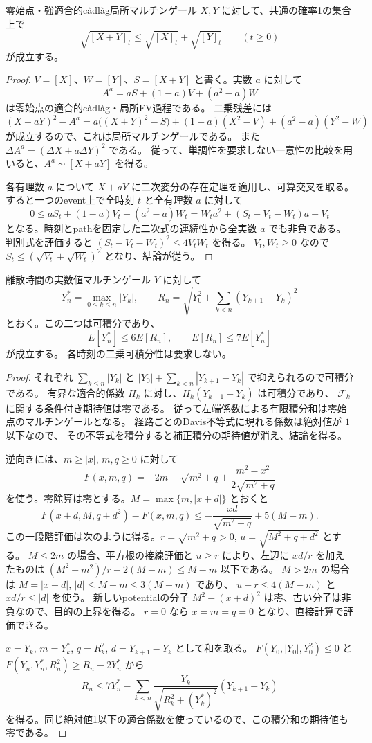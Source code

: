\begin{lemma}[二次変分の平方根の三角不等式]
零始点・強適合的c\`adl\`ag局所マルチンゲール $X,Y$ に対して、共通の確率1の集合上で
\[
 \sqrt{[X+Y]_t}\le\sqrt{[X]_t}+\sqrt{[Y]_t}\qquad(t\ge0)
\]
が成立する。
\end{lemma}
\begin{proof}
$V=[X]$、$W=[Y]$、$S=[X+Y]$ と書く。実数 $a$ に対して
\[
 A^a=aS+(1-a)V+(a^2-a)W
\]
は零始点の適合的c\`adl\`ag・局所FV過程である。
二乗残差には
\[
 (X+aY)^2-A^a
 =a\bigl((X+Y)^2-S\bigr)+(1-a)(X^2-V)+(a^2-a)(Y^2-W)
\]
が成立するので、これは局所マルチンゲールである。
また $\Delta A^a=(\Delta X+a\Delta Y)^2$ である。
従って、単調性を要求しない一意性の比較を用いると、$A^a\sim[X+aY]$ を得る。

各有理数 $a$ について $X+aY$ に二次変分の存在定理を適用し、可算交叉を取る。
すると一つのevent上で全時刻 $t$ と全有理数 $a$ に対して
\[
 0\le aS_t+(1-a)V_t+(a^2-a)W_t
   =W_ta^2+(S_t-V_t-W_t)a+V_t
\]
となる。時刻とpathを固定した二次式の連続性から全実数 $a$ でも非負である。
判別式を評価すると $(S_t-V_t-W_t)^2\le4V_tW_t$ を得る。
$V_t,W_t\ge0$ なので $S_t\le(\sqrt{V_t}+\sqrt{W_t})^2$ となり、結論が従う。
\end{proof}

\begin{lemma}
離散時間の実数値マルチンゲール $Y$ に対して
\[
 Y_n^*=\max_{0\le k\le n}|Y_k|,\qquad
 R_n=\sqrt{Y_0^2+\sum_{k<n}(Y_{k+1}-Y_k)^2}
\]
とおく。この二つは可積分であり、
\[
 E[Y_n^*]\le6E[R_n],\qquad E[R_n]\le7E[Y_n^*]
\]
が成立する。
各時刻の二乗可積分性は要求しない。
\end{lemma}
\begin{proof}
それぞれ $\sum_{k\le n}|Y_k|$ と
$|Y_0|+\sum_{k<n}|Y_{k+1}-Y_k|$ で抑えられるので可積分である。
有界な適合的係数 $H_k$ に対し、$H_k(Y_{k+1}-Y_k)$ は可積分であり、
$\mathcal F_k$ に関する条件付き期待値は零である。
従って左端係数による有限積分和は零始点のマルチンゲールとなる。
経路ごとのDavis不等式に現れる係数は絶対値が $1$ 以下なので、
その不等式を積分すると補正積分の期待値が消え、結論を得る。

逆向きには、$m\ge|x|$, $m,q\ge0$ に対して
\[
 F(x,m,q)=-2m+\sqrt{m^2+q}+\frac{m^2-x^2}{2\sqrt{m^2+q}}
\]
を使う。零除算は零とする。$M=\max\{m,|x+d|\}$ とおくと
\[
 F(x+d,M,q+d^2)-F(x,m,q)
 \le-\frac{xd}{\sqrt{m^2+q}}+5(M-m).
\]
この一段階評価は次のように得る。$r=\sqrt{m^2+q}>0$,
$u=\sqrt{M^2+q+d^2}$ とする。
$M\le2m$ の場合、平方根の接線評価と $u\ge r$ により、左辺に $xd/r$ を加えたものは
$(M^2-m^2)/r-2(M-m)\le M-m$ 以下である。
$M>2m$ の場合は $M=|x+d|$, $|d|\le M+m\le3(M-m)$ であり、
$u-r\le4(M-m)$ と $xd/r\le|d|$ を使う。
新しいpotentialの分子 $M^2-(x+d)^2$ は零、古い分子は非負なので、目的の上界を得る。
$r=0$ なら $x=m=q=0$ となり、直接計算で評価できる。

$x=Y_k$, $m=Y_k^*$, $q=R_k^2$, $d=Y_{k+1}-Y_k$ として和を取る。
$F(Y_0,|Y_0|,Y_0^2)\le0$ と $F(Y_n,Y_n^*,R_n^2)\ge R_n-2Y_n^*$ から
\[
 R_n\le7Y_n^*-\sum_{k<n}
 \frac{Y_k}{\sqrt{R_k^2+(Y_k^*)^2}}(Y_{k+1}-Y_k)
\]
を得る。同じ絶対値1以下の適合係数を使っているので、この積分和の期待値も零である。
\end{proof}

